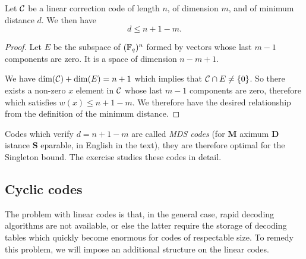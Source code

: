 \begin{prop}
\label{prop-borne-singleton}
 Let $ \mathcal{C} $ be a linear correction code of length $ n $, of dimension $ m $, and of minimum distance $ d $. We then have
\begin{equation}
\label{eq-borne-singleton}
d \leq n + 1-m.
\end{equation}
\end{prop}
\begin{proof}
Let $ E $ be the subspace of $ (\mathbb{F}_q)^n $ formed by vectors whose last $ m-1 $ components are zero. It is a space of dimension $ n-m + 1$.
 
We have $ \dim (\mathcal{C}) + \dim (E) = n + 1 $ which implies that $ \mathcal{C} \cap E \neq \{0\} $. So there exists a non-zero $ x $ element in $ \mathcal{C} $ whose last $ m-1 $ components are zero, therefore which satisfies $ w (x) \leq n + 1-m $. We therefore have the desired relationship from the definition of the minimum distance.
\end{proof}
 
 
\begin{rem}
  Codes which verify $ d = n + 1-m $ are called \textit{MDS codes} (for \textbf{M} aximum \textbf{D} istance \textbf{S} eparable, in English in the text), they are therefore optimal for the Singleton bound. The exercise  studies these codes in detail.
\end{rem}
 
\subsection{Cyclic codes}
\label{sect2-cyclic-codes}
 
 
The problem with linear codes is that, in the general case, rapid decoding algorithms are not available, or else the latter require the storage of decoding tables which quickly become enormous for codes of respectable size. To remedy this problem, we will impose an additional structure on the linear codes.
 
